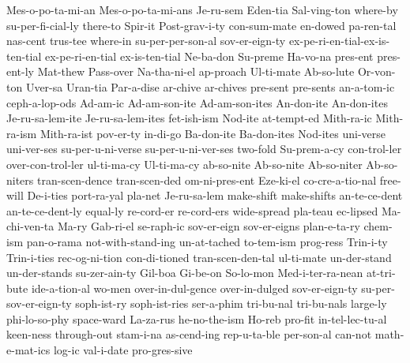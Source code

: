 {Mes-o-po-ta-mi-an
Mes-o-po-ta-mi-ans
Je-ru-sem
Eden-tia
Sal-ving-ton
where-by
su-per-fi-cial-ly
there-to
Spir-it
Post-grav-i-ty
con-sum-mate
en-dowed
pa-ren-tal
nas-cent
trus-tee
where-in
su-per-per-son-al
sov-er-eign-ty
ex-pe-ri-en-tial-ex-is-ten-tial
ex-pe-ri-en-tial
ex-is-ten-tial
Ne-ba-don
Su-preme
Ha-vo-na
pres-ent
pres-ent-ly
Mat-thew
Pass-over
Na-tha-ni-el
ap-proach
Ul-ti-mate
Ab-so-lute
Or-von-ton
Uver-sa
Uran-tia
Par-a-dise
ar-chive
ar-chives
pre-sent
pre-sents
an-a-tom-ic
ceph-a-lop-ods
Ad-am-ic
Ad-am-son-ite
Ad-am-son-ites
An-don-ite
An-don-ites
Je-ru-sa-lem-ite
Je-ru-sa-lem-ites
fet-ish-ism
Nod-ite
at-tempt-ed
Mith-ra-ic
Mith-ra-ism
Mith-ra-ist
pov-er-ty
in-di-go
Ba-don-ite
Ba-don-ites
Nod-ites
uni-verse
uni-ver-ses
su-per-u-ni-verse
su-per-u-ni-ver-ses
two-fold
Su-prem-a-cy
con-trol-ler
over-con-trol-ler
ul-ti-ma-cy
Ul-ti-ma-cy
ab-so-nite
Ab-so-nite
Ab-so-niter
Ab-so-niters
tran-scen-dence
tran-scen-ded
om-ni-pres-ent
Eze-ki-el
co-cre-a-tio-nal
free-will
De-i-ties
port-ra-yal
pla-net
Je-ru-sa-lem
make-shift
make-shifts
an-te-ce-dent
an-te-ce-dent-ly
equal-ly
re-cord-er
re-cord-ers
wide-spread
pla-teau
ec-lipsed
Ma-chi-ven-ta
Ma-ry
Gab-ri-el
se-raph-ic
sov-er-eign
sov-er-eigns
plan-e-ta-ry
chem-ism
pan-o-rama
not-with-stand-ing
un-at-tached
to-tem-ism
prog-ress
Trin-i-ty
Trin-i-ties
rec-og-ni-tion
con-di-tioned
tran-scen-den-tal
ul-ti-mate
un-der-stand
un-der-stands
su-zer-ain-ty
Gil-boa
Gi-be-on
So-lo-mon
Med-i-ter-ra-nean
at-tri-bute
ide-a-tion-al
wo-men
over-in-dul-gence
over-in-dulged
sov-er-eign-ty
su-per-sov-er-eign-ty
soph-ist-ry
soph-ist-ries
ser-a-phim
tri-bu-nal
tri-bu-nals
large-ly
phi-lo-so-phy
space-ward
La-za-rus
he-no-the-ism
Ho-reb
pro-fit
in-tel-lec-tu-al
keen-ness
through-out
stam-i-na
as-cend-ing
rep-u-ta-ble
per-son-al
can-not
math-e-mat-ics
log-ic
val-i-date
pro-gres-sive
}
